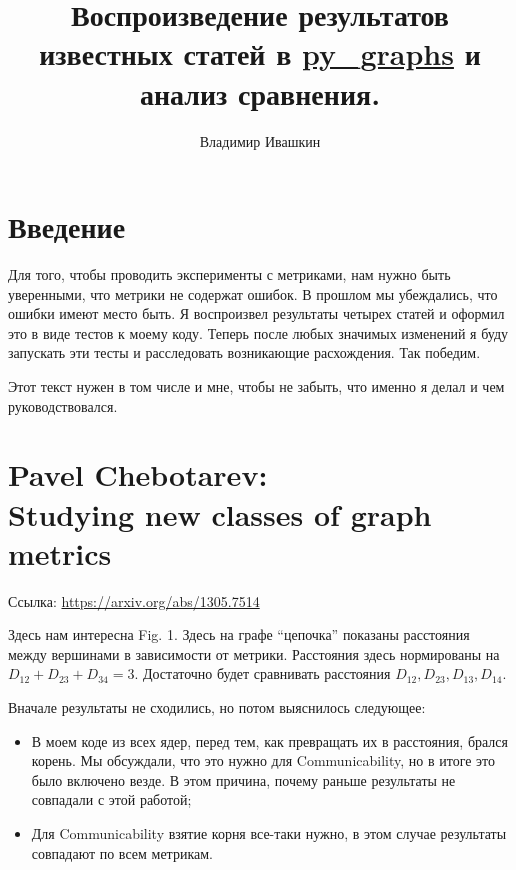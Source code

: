 \documentclass{article}
\title{
        Воспроизведение результатов известных статей в \href{https://github.com/illusionww/py_graphs}{py\_graphs} и анализ сравнения.
}
\author{Владимир Ивашкин}
\begin{document}
\maketitle


\section*{Введение}
Для того, чтобы проводить эксперименты с метриками, нам нужно быть уверенными, что метрики не содержат ошибок. В прошлом мы убеждались, что ошибки имеют место быть.
Я воспроизвел результаты четырех статей и оформил это в виде тестов к моему коду. Теперь после любых значимых изменений я буду запускать эти тесты и расследовать возникающие расхождения. Так победим.

Этот текст нужен в том числе и мне, чтобы не забыть, что именно я делал и чем руководствовался.


\section{Pavel Chebotarev:\\
         Studying new classes of graph metrics}
Ссылка: \url{https://arxiv.org/abs/1305.7514}

Здесь нам интересна Fig. 1. Здесь на графе ``цепочка'' показаны расстояния между вершинами в зависимости от метрики. Расстояния здесь нормированы на $D_{12} + D_{23} + D_{34} = 3$.
Достаточно будет сравнивать расстояния $D_{12}, D_{23}, D_{13}, D_{14}$.

Вначале результаты не сходились, но потом выяснилось следующее:
\begin{itemize}
  \item В моем коде из всех ядер, перед тем, как превращать их в расстояния, брался корень. Мы обсуждали, что это нужно для Communicability, но в итоге это было включено везде. В этом причина, почему раньше результаты не совпадали с этой работой;
  \item Для Communicability взятие корня все-таки нужно, в этом случае результаты совпадают по всем метрикам.
\end{itemize}
\end{document}
